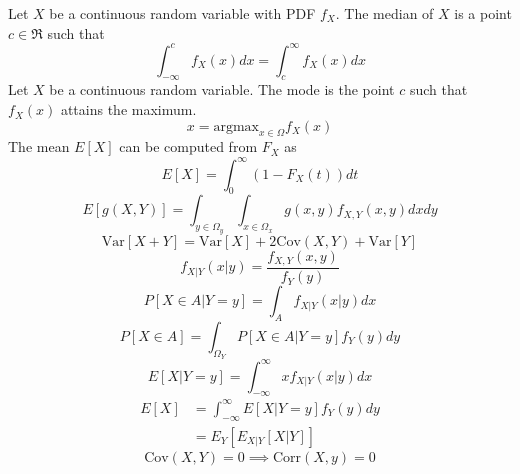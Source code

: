 \documentclass[nobib]{tufte-handout}
\begin{document}
Let $X$ be a continuous random variable with PDF
$f_X$. The median of $X$ is a point $c \in \Re$ such that
\begin{equation}
    \int_{-\infty}^{c} f_X(x) dx = \int_{c}^{\infty}f_X(x) dx
\end{equation}
Let $X$ be a continuous random variable. The mode is
the point $c$ such that $f_X(x)$ attains the maximum.
\begin{equation}
    x = \text{argmax}_{x \in \Omega} f_X(x)
\end{equation}
The mean $E[X]$ can be computed from
$F_X$ as
\begin{equation}
    E[X] = \int_{0}^{\infty} (1-F_X(t))dt
\end{equation}
\begin{equation}
    E[g(X,Y)] = \int_{y\in \Omega_y}\int_{x\in \Omega_x} g(x,y) f_{X,Y}(x,y)dxdy
\end{equation}
\begin{equation}
    \text{Var}[X+Y] = \text{Var}[X] + 2\text{Cov}(X,Y) + \text{Var}[Y]
\end{equation}
\begin{equation}
    f_{X|Y}(x|y) = \frac{f_{X,Y}(x,y)}{f_Y(y)}
\end{equation}
\begin{equation}
    P[X \in A | Y=y] = \int_{A} f_{X|Y}(x|y)dx
\end{equation}
\begin{equation}
    P[X\in A] = \int_{\Omega_Y} P[X\in A|Y = y]f_Y(y)dy
\end{equation}
\begin{equation}
    E[X|Y=y] = \int_{-\infty}^{\infty}xf_{X|Y}(x|y)dx
\end{equation}
\begin{align}
    E[X] & = \int_{-\infty}^{\infty} E[X|Y=y]f_Y(y)dy \\
         & = E_Y[E_{X|Y}[X|Y]]
\end{align}
\begin{equation}
    \text{Cov}(X,Y) = 0 \implies \text{Corr}(X,y) = 0
\end{equation}
\end{document}
